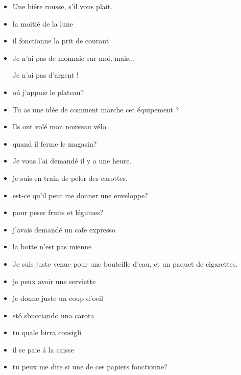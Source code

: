 \begin{itemize}

\item Une bi\'ere rousse, s'il vous plait.

\item la moiti\'e de la lune
\item il fonctionne la prit de courant

\item Je n'ai pas de monnaie sur moi, mais...

Je n'ai pas d'argent !

\item o\'u j'appuie le plateau?

\item Tu as une id\'ee de comment marche cet \'equipement ?

\item Ils ont vol\'e mon nouveau v\'elo.

\item quand il ferme le magasin?

\item Je vous l'ai demand\'e il y a une heure.

\item je suis en train de peler des carottes.

\item est-ce qu'il peut me donner une enveloppe?

\item pour peser fruits et légumes?

\item j'avais demand\'e un cafe expresso

\item la botte n'est pas mienne

\item Je suis juste venue pour une bouteille d'eau, et un paquet de cigarettes.

\item je peux avoir une serviette

\item je donne juste un coup d'oeil

\item st\'o sbucciando una carota

\item tu quale birra consigli

\item il se paie \'a la caisse

\item tu peux me dire si une de ces papiers fonctionne?


\end{itemize}
